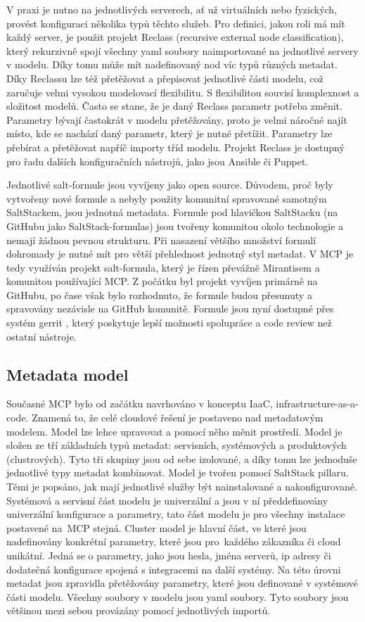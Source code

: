 V praxi je nutno na jednotlivých serverech, ať už virtuálních nebo fyzických, provést konfiguraci několika typů těchto služeb. Pro definici, jakou roli má mít každý server, je použit projekt Reclass (recursive external node classification), který rekurzivně spojí všechny yaml soubory naimportované na jednotlivé servery v modelu. Díky tomu může mít nadefinovaný nod víc typů různých metadat. Díky Reclassu lze též přetěžovat a přepisovat jednotlivé části modelu, což zaručuje velmi vysokou modelovací flexibilitu. S flexibilitou souvisí komplexnost a složitost modelů. Často se stane, že je daný Reclass parametr potřeba změnit. Parametry bývají častokrát v modelu přetěžovány, proto je velmi náročné najít místo, kde se nachází daný parametr, který je nutné přetížit. Parametry lze přebírat a přetěžovat napříč importy tříd modelu. Projekt Reclass je dostupný pro řadu dalších konfiguračních nástrojů, jako jsou Ansible či Puppet.

Jednotlivé salt-formule jsou vyvíjeny jako open source. Důvodem, proč byly vytvořeny nové formule a nebyly použity komunitní spravované samotným SaltStackem, jsou jednotná metadata. Formule pod hlavičkou SaltStacku (na GitHubu jako SaltStack-formulas) jsou tvořeny komunitou okolo technologie a nemají žádnou pevnou strukturu. Při nasazení většího množství formulí dohromady je nutné mít pro větší přehlednost jednotný styl metadat. V MCP je tedy využíván projekt salt-formula, který je řízen převážně Mirantisem a komunitou používající MCP. Z počátku byl projekt vyvíjen primárně na GitHubu, po čase však bylo rozhodnuto, že formule budou přesunuty a spravovány nezávisle na GitHub komunitě. Formule jsou nyní dostupné přes systém gerrit \cite{mcp_gerrit}, který poskytuje lepší možnosti spolupráce a code review než ostatní nástroje.

\subsection{Metadata model}
Současné MCP bylo od začátku navrhováno v konceptu IaaC, infrastructure-as-a-code. Znamená to, že celé cloudové řešení je postaveno nad metadatovým modelem. Model lze lehce upravovat a pomocí něho měnit prostředí. Model je složen ze tří základních typů metadat: servisních, systémových a produktových (clustrových). Tyto tři skupiny jsou od sebe izolované, a díky tomu lze jednoduše jednotlivé typy metadat kombinovat. Model je tvořen pomocí SaltStack pillaru. Těmi je popsáno, jak mají jednotlivé služby být nainstalované a nakonfigurované. Systémová a servisní část modelu je univerzální a jsou v ní předdefinovány univerzální konfigurace a parametry, tato část modelu je pro všechny instalace postavené na MCP stejná. Cluster model je hlavní část, ve které jsou nadefinovány konkrétní parametry, které jsou pro každého zákazníka či cloud unikátní. Jedná se o parametry, jako jsou hesla, jména serverů, ip adresy či dodatečná konfigurace spojená s integracemi na další systémy. Na této úrovni metadat jsou zpravidla přetěžovány parametry, které jsou definované v systémové části modelu. Všechny soubory v modelu jsou yaml soubory. Tyto soubory jsou většinou mezi sebou provázány pomocí jednotlivých importů.

